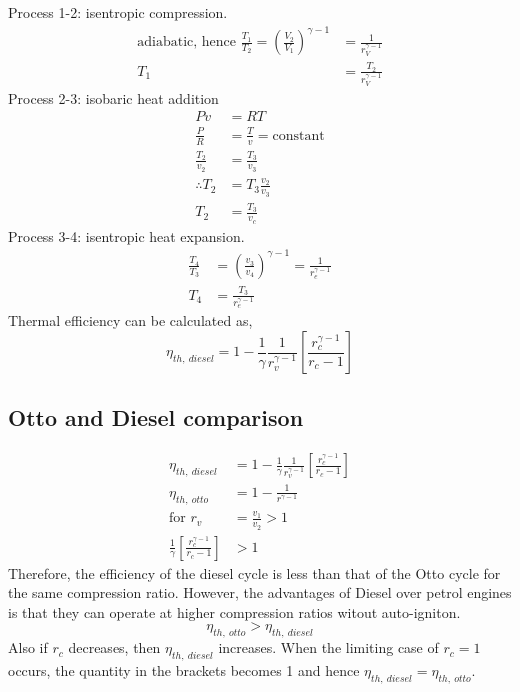 \documentclass[class=report, crop=false, 12pt,a4paper]{standalone}
\begin{document}
Process 1-2: isentropic compression.
\begin{align}
  \textrm{adiabatic, hence } \frac{T_1}{T_2} = \left( \frac{V_2}{V_1} \right)^{\gamma -1} &= \frac{1}{r_V^{\gamma - 1}}\\
  T_1 &= \frac{T_2}{r_V^{\gamma - 1}} \label{diesel12}
\end{align}
Process 2-3: isobaric heat addition
\begin{align}
  Pv &= RT\\
  \frac{P}{R} &= \frac{T}{v} = \textrm{constant}\\
  \frac{T_2}{v_2} &= \frac{T_3}{v_3}\\
  \therefore T_2 &= T_3 \frac{v_2}{v_3}\\
  T_2 &= \frac{T_3}{v_c} \label{diesel23}
\end{align}
Process 3-4: isentropic heat expansion.
\begin{align}
  \frac{T_4}{T_3} &= \left( \frac{v_3}{v_4} \right)^{\gamma -1} = \frac{1}{r_e^{\gamma -1}}\\
  T_4 &= \frac{T_3}{r_e^{\gamma -1}} \label{diesel34}
\end{align}
Thermal efficiency can be calculated as,
\begin{equation}
  \eta_{th, \ diesel} = 1 - \frac{1}{\gamma} \frac{1}{r_v^{\gamma -1}} \left[ \frac{r_c^{\gamma -1}}{r_c - 1} \right]
\end{equation}
\subsection{Otto and Diesel comparison}
\begin{align}
  \eta_{th, \ diesel} &= 1 - \frac{1}{\gamma} \frac{1}{r_v^{\gamma -1}} \left[ \frac{r_c^{\gamma -1}}{r_c - 1} \right]\\
  \eta_{th, \ otto} &= 1 - \frac{1}{r^{\gamma -1}}\\
  \textrm{for } r_v &= \frac{v_1}{v_2} > 1\\
  \frac{1}{\gamma} \left[ \frac{r_c^{\gamma -1}}{r_c - 1} \right] &> 1
\end{align}
Therefore, the efficiency of the diesel cycle is less than that of the Otto cycle for the same compression ratio. However, the advantages of Diesel over petrol engines is that they can operate at higher compression ratios witout auto-igniton.
\begin{equation}
  \eta_{th, \ otto} > \eta_{th, \ diesel}
\end{equation}
Also if $r_c$ decreases, then $\eta_{th, \ diesel}$ increases. When the limiting case of $r_c = 1$ occurs, the quantity in the brackets becomes 1 and hence $\eta_{th, \ diesel} = \eta_{th, \ otto}$.
\end{document}
